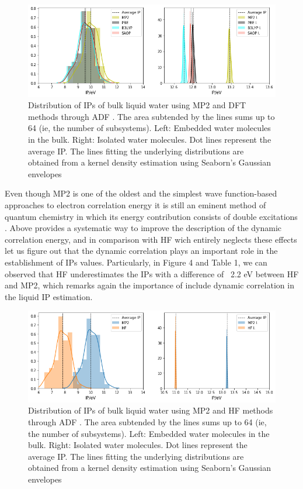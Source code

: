 \documentclass[12pt,a4paper]{article}
\begin{document}
\begin{figure}[!ht]
        \centering
        \includegraphics[width=\linewidth]{MP2-DFT}
	\caption{Distribution of IPs of bulk liquid water using MP2 and DFT methods through ADF \cite{te2001chemistry}. The area subtended by the lines sums up to 64 (ie, the number of subsystems). Left: Embedded water molecules in the bulk. Right: Isolated water molecules. Dot lines represent the average IP. The lines fitting the underlying distributions are obtained from a kernel density estimation using Seaborn's Gaussian envelopes\cite{waskom2017c}}
\end{figure}

Even though MP2 is one of the oldest and the simplest wave function-based approaches to electron correlation energy it is still an eminent method 
of quantum chemistry in which its energy contribution consists of double excitations \cite{fink2016does}. Above provides a systematic way to
improve the description of the dynamic correlation energy, and in comparison with HF\cite{marshall1961unrestricted} wich entirely neglects these 
effects let us figure out that the dynamic correlation plays an important role in the establishment of IPs values. Particularly, in Figure 4 and
Table 1, we can observed that HF underestimates the IPs with a difference of ~2.2 eV between HF and MP2, which remarks again the importance of
include dynamic correlation in the liquid IP estimation. 

\begin{figure}[!ht]
        \centering
        \includegraphics[width=\linewidth]{MP2-HF}
        \caption{Distribution of IPs of bulk liquid water using MP2 and HF methods through ADF \cite{te2001chemistry}. The area subtended by the lines sums up to 64 (ie, the number of subsystems). Left: Embedded water molecules in the bulk. Right: Isolated water molecules. Dot lines represent the average IP. The lines fitting the underlying distributions are obtained from a kernel density estimation using Seaborn's Gaussian envelopes\cite{waskom2017c}}
\end{figure}
\end{document}
